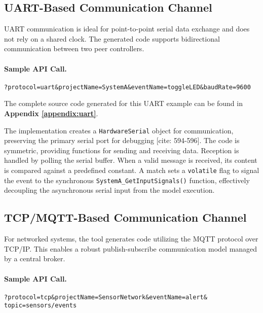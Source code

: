 \subsection{UART-Based Communication Channel}
\label{subsec:uart_analysis}
UART communication is ideal for point-to-point serial data exchange and does not rely on a shared clock. The generated code supports bidirectional communication between two peer controllers.

\paragraph{Sample API Call.}
\begin{verbatim}
?protocol=uart&projectName=SystemA&eventName=toggleLED&baudRate=9600
\end{verbatim}

The complete source code generated for this UART example can be found in \textbf{Appendix \ref{appendix:uart}}.

The implementation creates a \texttt{HardwareSerial} object for communication, preserving the primary serial port for debugging [cite: 594-596]. The code is symmetric, providing functions for sending and receiving data. Reception is handled by polling the serial buffer. When a valid message is received, its content is compared against a predefined constant. A match sets a \texttt{volatile} flag to signal the event to the synchronous \texttt{SystemA\_GetInputSignals()} function, effectively decoupling the asynchronous serial input from the model execution.

\subsection{TCP/MQTT-Based Communication Channel}
\label{subsec:tcp_analysis}
For networked systems, the tool generates code utilizing the MQTT protocol over TCP/IP. This enables a robust publish-subscribe communication model managed by a central broker.

\paragraph{Sample API Call.}
\begin{verbatim}
?protocol=tcp&projectName=SensorNetwork&eventName=alert&
topic=sensors/events
\end{verbatim}

